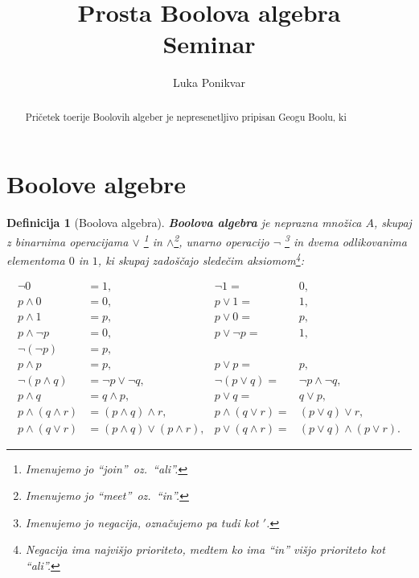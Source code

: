 \documentclass{amsart}
\title[Prosta Boolova algebra]{Prosta Boolova algebra\\\Large Seminar}
\author{Luka Ponikvar}
\newtheorem{definicija}[izrek]{Definicija}
\begin{document}
\maketitle


\begin{abstract}
    Pričetek toerije Boolovih algeber je nepresenetljivo pripisan Geogu Boolu,
    ki 
\end{abstract}


\section{Boolove algebre}

\begin{definicija}[Boolova algebra]
    {\bf Boolova algebra} je neprazna množica \(A\), skupaj z binarnima operacijama \(\vee\) \footnote{Imenujemo jo ``join''\ oz.\ 
    ``ali''.} in \(\wedge\)\footnote{Imenujemo jo ``meet''\ oz.\ ``in''.}, unarno operacijo \(\neg\)
    \footnote{Imenujemo jo negacija, označujemo pa tudi kot \('\).} in dvema odlikovanima 
    elementoma \(0\) in \(1\), ki skupaj zadoščajo sledečim aksiomom\footnote{Negacija ima najvišjo prioriteto, medtem ko ima ``in'' višjo prioriteto kot ``ali''.}:

    \begin{align}
        \label{eq0}
        \neg 0 &= 1, & \neg 1 =& 0,\\ \label{eq1}
        p \wedge 0 &= 0, & p \vee 1 =& 1,\\ \label{eq2}
        p \wedge 1 &= p, & p \vee 0 =& p,\\ \label{eq3}
        p \wedge \neg p &= 0, & p \vee \neg p =& 1,\\ \label{eq4}
         \neg (\neg p) &= p,\\ \label{eq5}
        p \wedge p &= p, & p \vee p =& p,\\ \label{eq6}
        \neg (p \wedge q) &= \neg p \vee \neg q, & \neg (p \vee q) =& \neg p \wedge \neg q,\\ \label{eq7}
        p \wedge q &= q \wedge p, & p \vee q =& q \vee p,\\ \label{eq8}
        p \wedge (q \wedge r) &= (p \wedge q) \wedge r, & p \wedge (q \vee r) =& (p \vee q) \vee r,\\ \label{eq9}
        p \wedge (q \vee r) &= (p \wedge q) \vee (p \wedge r), & p \vee (q \wedge r) =& (p \vee q) \wedge (p \vee r).
    \end{align}
    
\end{definicija}
\end{document}
